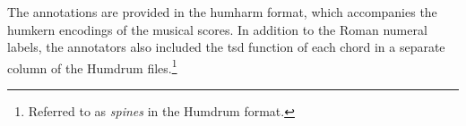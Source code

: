 
The annotations are provided in the \gls{humharm} format,
which accompanies the \gls{humkern} encodings of the musical
scores. In addition to the Roman numeral labels, the
annotators also included the \gls{tsd} function of each
chord in a separate column of the Humdrum
files.\footnote{Referred to as \emph{spines} in the Humdrum
format.}
